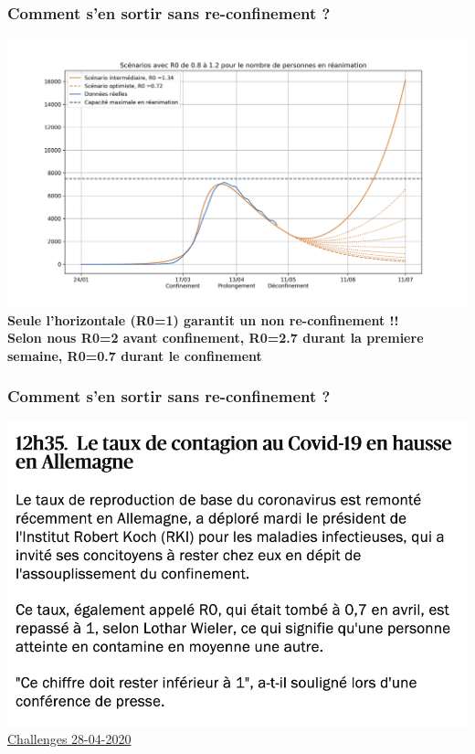 \documentclass[a4paper]{cours-bdd}
\begin{document}

\begin{frame}[fragile]
\frametitle{Comment s'en sortir sans re-confinement ?}

  \begin{center}
    \includegraphics[width=1.0\linewidth]{figure9.jpg} \\

    \textbf{Seule l'horizontale (R0=1) garantit un non re-confinement  !!\\
    {\tiny Selon nous R0=2 avant confinement, R0=2.7 durant la premiere semaine, R0=0.7 durant le confinement}}
  \end{center}
  
\end{frame}




\begin{frame}[fragile]
\frametitle{Comment s'en sortir sans re-confinement ?}

  \begin{center}
    \includegraphics[width=0.8\linewidth]{challenges_28_04_Allemagne.png} \\
\href{https://www.challenges.fr/france/en-direct-deconfinement-six-francais-sur-dix-ne-font-pas-confiance-au-gouvernement_707222}{Challenges 28-04-2020}
  \end{center}
  
\end{frame}
\end{document}
